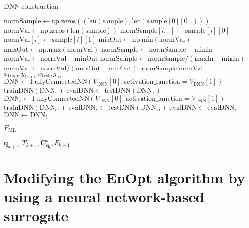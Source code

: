 \begin{algorithm}[H]%
\caption{DNN construction}
\begin{algorithmic}[1]
\State $\mathrm{normSample} \gets \mathrm{np.zeros}((\mathrm{len}(\mathrm{sample}), \mathrm{len}(\mathrm{sample}[0][0])))$
\State $\mathrm{normVal} \gets \mathrm{np.zeros}(\mathrm{len}(\mathrm{sample}))$
\State $\mathrm{normSample}[i, :] \gets \mathrm{sample}[i][0]$
\State $\mathrm{normVal}[i] \gets \mathrm{sample}[i][1]$
\EndFor
\State $\mathrm{minOut} \gets \mathrm{np.min}(\mathrm{normVal})$
\State $\mathrm{maxOut} \gets \mathrm{np.max}(\mathrm{normVal})$
\State $\mathrm{normSample} \gets \mathrm{normSample}-\mathrm{minIn}$
\State $\mathrm{normVal} \gets  \mathrm{normVal}-\mathrm{minOut}$
\State $\mathrm{normSample} \gets \mathrm{normSample}/(\mathrm{maxIn}-\mathrm{minIn})$
\State $\mathrm{normVal} \gets \mathrm{normVal}/(\mathrm{maxOut}-\mathrm{minOut})$
\State {}$\mathrm{normSample}$$\mathrm{normVal}$$x_\mathrm{train}, y_\mathrm{train}, x_\mathrm{test}, y_\mathrm{test}$
\State $\mathrm{DNN} \gets \mathrm{FullyConnectedNN}(V_\mathrm{DNN}[0], \mathrm{activation\_function}=V_\mathrm{DNN}[1])$
\State $\mathrm{trainDNN}(\mathrm{DNN}, )$
\State $\mathrm{evalDNN} \gets \mathrm{testDNN}(\mathrm{DNN}, )$
\State $\mathrm{DNN}_i \gets \mathrm{FullyConnectedNN}(V_\mathrm{DNN}[0], \mathrm{activation\_function}=V_\mathrm{DNN}[1])$
\State $\mathrm{trainDNN}(\mathrm{DNN}_i, )$
\State $\mathrm{evalDNN}_i \gets \mathrm{testDNN}(\mathrm{DNN}_i, )$
\State $\mathrm{evalDNN} \gets \mathrm{evalDNN}_i$
\State $\mathrm{DNN} \gets \mathrm{DNN}_i$
\EndIf
\EndFor

\State {}$F_\mathrm{ML}$


\State \Return $\mathbf{q}_{k+1},T_{k+1},\mathbf{C}_{\mathbf{q}_k}^k,F_{k+1}$
\EndProcedure
\end{algorithmic}
\end{algorithm}


\section{Modifying the EnOpt algorithm by using a neural network-based surrogate}
